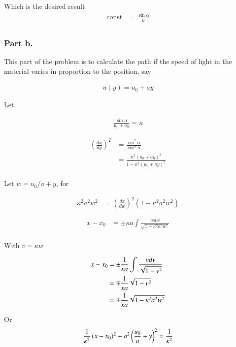 Which is the desired result
\begin{align*}
\text{const} &= \frac{\sin\alpha}{u} \\
\end{align*}

\subsubsection{Part b. }

This part of the problem is to calculate the path if the speed of light
in the material varies in proportion to the position, say

\begin{align*}
u(y) = u_0 + a y
\end{align*}

Let

\begin{align*}
\frac{\sin\alpha}{u_0 + a y} = \kappa
\end{align*}

\begin{align*}
\left( \frac{dx}{dy} \right)^2 
&= \frac{\sin^2 \alpha}{\cos^2 \alpha} \\
&= 
\frac{\kappa^2 (u_0 + a y)^2}{ 1 - \kappa^2 (u_0 + a y)^2 } \\
\end{align*}

Let $w = u_0/a + y$, for

\begin{align*}
\kappa^2 a^2 w^2 &= \left(\frac{dx}{dw}\right)^2 (1 - \kappa^2 a^2 w^2 )
\end{align*}

\begin{align*}
x - x_0 &=
\pm \kappa a \int \frac{w dw }{\sqrt{ 1 - \kappa^2 a^2 w^2 }} \\
\end{align*}

With $v = \kappa w$

\begin{align*}
x - x_0 
&=
\pm \frac{1}{\kappa a} \int \frac{v dv }{\sqrt{ 1 - v^2 }} \\
&=
\mp \frac{1}{\kappa a} \sqrt{ 1 - v^2 } \\
&=
\mp \frac{1}{\kappa a} \sqrt{ 1 - \kappa^2 a^2 w^2 } \\
\end{align*}

Or
\begin{align*}
\frac{1}{\kappa^2}\left({x}- {x_0} \right)^2 + a^2 \left(\frac{u_0}{a} + y\right)^2 = \frac{1}{\kappa^2}
\end{align*}

